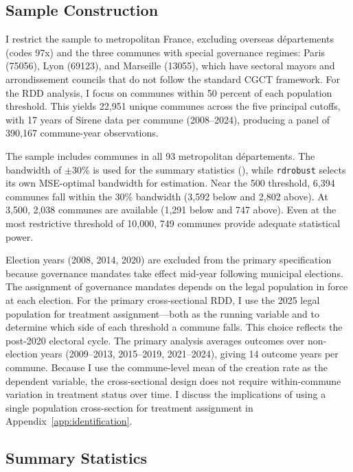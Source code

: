 \documentclass[12pt]{article}
\begin{document}
\subsection{Sample Construction}

I restrict the sample to metropolitan France, excluding overseas d\'{e}partements (codes 97x) and the three communes with special governance regimes: Paris (75056), Lyon (69123), and Marseille (13055), which have sectoral mayors and arrondissement councils that do not follow the standard CGCT framework. For the RDD analysis, I focus on communes within 50 percent of each population threshold. This yields 22,951 unique communes across the five principal cutoffs, with 17 years of Sirene data per commune (2008--2024), producing a panel of 390,167 commune-year observations.

The sample includes communes in all 93 metropolitan d\'{e}partements. The bandwidth of $\pm$30\% is used for the summary statistics (), while \texttt{rdrobust} selects its own MSE-optimal bandwidth for estimation. Near the 500 threshold, 6,394 communes fall within the 30\% bandwidth (3,592 below and 2,802 above). At 3,500, 2,038 communes are available (1,291 below and 747 above). Even at the most restrictive threshold of 10,000, 749 communes provide adequate statistical power.

Election years (2008, 2014, 2020) are excluded from the primary specification because governance mandates take effect mid-year following municipal elections. The assignment of governance mandates depends on the legal population in force at each election. For the primary cross-sectional RDD, I use the 2025 legal population for treatment assignment---both as the running variable and to determine which side of each threshold a commune falls. This choice reflects the post-2020 electoral cycle. The primary analysis averages outcomes over non-election years (2009--2013, 2015--2019, 2021--2024), giving 14 outcome years per commune. Because I use the commune-level mean of the creation rate as the dependent variable, the cross-sectional design does not require within-commune variation in treatment status over time. I discuss the implications of using a single population cross-section for treatment assignment in Appendix~\ref{app:identification}.

\subsection{Summary Statistics}
\end{document}
